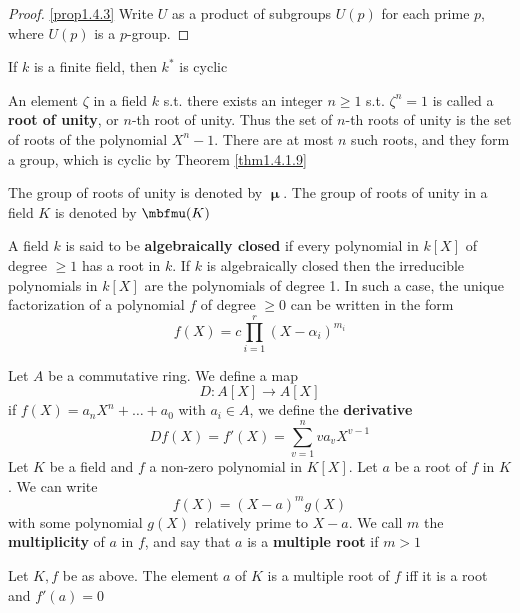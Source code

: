 \documentclass[11pt]{article}
\begin{document}
\begin{proof}
\ref{prop1.4.3}
Write \(U\) as a product of subgroups \(U(p)\) for each prime \(p\), where \(U(p)\) is a \(p\)-group.
\end{proof}

\begin{corollary}[]
If \(k\) is a finite field, then \(k^*\) is cyclic
\end{corollary}

An element \(\zeta\) in a field \(k\) s.t. there exists an integer \(n\ge 1\) s.t. \(\zeta^n=1\) is called a
\textbf{root of unity}, or \(n\)-th root of unity. Thus the set of \(n\)-th roots of unity is the set of
roots of the polynomial \(X^n-1\). There are at most \(n\) such roots, and they form a group,
which is cyclic by Theorem \ref{thm1.4.1.9}

The group of roots of unity is denoted by \(\mbfmu\). The group of roots of unity in a field \(K\)
is denoted by \(\bmu(K)\)


A field \(k\) is said to be \textbf{algebraically closed} if every polynomial in \(k[X]\) of
degree \(\ge 1\) has a root in \(k\). If \(k\) is algebraically closed then the irreducible
polynomials in \(k[X]\) are the polynomials of degree 1. In such a case, the unique factorization
of a polynomial \(f\) of degree \(\ge 0\)  can be written in the form
\begin{equation*}
f(X)=c\prod_{i=1}^r(X-\alpha_i)^{m_i}
\end{equation*}

Let \(A\) be a commutative ring. We define a map
\begin{equation*}
D:A[X]\to A[X]
\end{equation*}
if \(f(X)=a_nX^n+\dots+a_0\) with \(a_i\in A\), we define the \textbf{derivative}
\begin{equation*}
Df(X)=f'(X)=\sum_{v=1}^nva_vX^{v-1}
\end{equation*}
Let \(K\) be a field and \(f\) a non-zero polynomial in \(K[X]\). Let \(a\) be a root of \(f\)
in \(K\). We can write
\begin{equation*}
f(X)=(X-a)^mg(X)
\end{equation*}
with some polynomial \(g(X)\) relatively prime to \(X-a\). We call \(m\) the \textbf{multiplicity}
of \(a\) in \(f\), and say that \(a\) is a \textbf{multiple root} if \(m>1\)

\begin{proposition}[]
Let \(K,f\) be as above. The element \(a\) of \(K\) is a multiple root of \(f\) iff it is a root
and \(f'(a)=0\)
\end{proposition}
\end{document}
